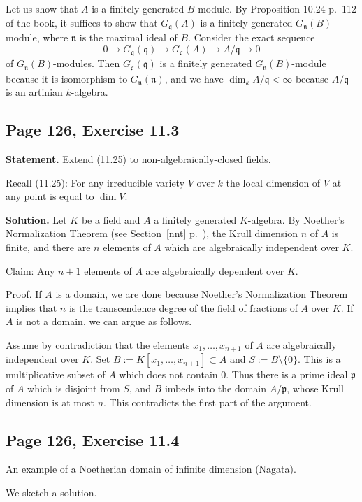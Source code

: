 \documentclass[parskip=half,fontsize=12pt]{scrartcl}%
\newcommand{\mf}{\mathfrak}
\newcommand{\nnn}{\mf n}
\newcommand{\ppp}{\mf p}
\newcommand{\qqq}{\mf q}
\begin{document}
Let us show that $A$ is a finitely generated $B$-module. By Proposition 10.24 p.~112 of the book, it suffices to show that $G_\qqq(A)$ is a finitely generated $G_\nnn(B)$-module, where $\nnn$ is the maximal ideal of $B$. Consider the exact sequence 
$$
0\to G_\qqq(\qqq)\to G_\qqq(A)\to A/\qqq\to0
$$ 
of $G_\nnn(B)$-modules. Then $G_\qqq(\qqq)$ is a finitely generated $G_\nnn(B)$-module because it is isomorphism to $G_\nnn(\nnn)$, and we have $\dim_kA/\qqq<\infty$ because $A/\qqq$ is an artinian $k$-algebra. 

\subsection{Page 126, Exercise 11.3}%

\textbf{Statement.} Extend (11.25) to non-algebraically-closed fields.

Recall (11.25): For any irreducible variety $V$ over $k$ the local dimension of $V$ at any point is equal to $\dim V$.

\textbf{Solution.} Let $K$ be a field and $A$ a finitely generated $K$-algebra. By Noether's Normalization Theorem (see Section~\ref{nnt} p.~\pageref{nnt}), the Krull dimension $n$ of $A$ is finite, and there are $n$ elements of $A$ which are algebraically independent over $K$. 

Claim: Any $n+1$ elements of $A$ are algebraically dependent over $K$.

Proof. If $A$ is a domain, we are done because Noether's Normalization Theorem implies that $n$ is the transcendence degree of the field of fractions of $A$ over $K$. If $A$ is not a domain, we can argue as follows. 

Assume by contradiction that the elements $x_1,\ldots,x_{n+1}$ of $A$ are algebraically independent over $K$. Set $B:=K[x_1,\ldots,x_{n+1}]\subset A$ and $S:=B\setminus\{0\}$. This is a multiplicative subset of $A$ which does not contain $0$. Thus there is a prime ideal $\ppp$ of $A$ which is disjoint from $S$, and $B$ imbeds into the domain $A/\ppp$, whose Krull dimension is at most $n$. This contradicts the first part of the argument. 

\subsection{Page 126, Exercise 11.4}%

An example of a Noetherian domain of infinite dimension (Nagata).

We sketch a solution. 
\end{document}
